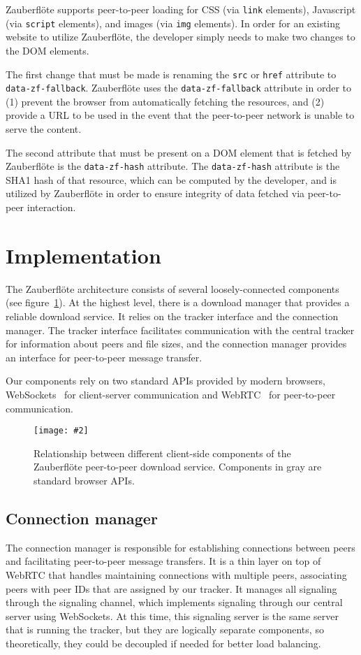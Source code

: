 \documentclass[letterpaper,twocolumn,10pt]{article}
\newcommand{\zbf}{Zauberfl\"{o}te\xspace}
\newcommand{\inclfigure}[3]{
    \begin{figure}
        \begin{centering}
            \texttt{[image: \#2]}
            \caption{#3}
            \label{#1}
        \end{centering}
    \end{figure}
}
\begin{document}
\zbf supports peer-to-peer loading for CSS (via \texttt{link} elements), Javascript (via \texttt{script} elements), and images (via \texttt{img} elements). In order for an existing website to utilize \zbf, the developer simply needs to make two changes to the DOM elements.

The first change that must be made is renaming the \texttt{src} or \texttt{href} attribute to  \texttt{data-zf-fallback}. \zbf uses the \texttt{data-zf-fallback} attribute in order to (1) prevent the browser from automatically fetching the resources, and (2) provide a URL to be used in the event that the peer-to-peer network is unable to serve the content.

The second attribute that must be present on a DOM element that is fetched by \zbf is the \texttt{data-zf-hash} attribute. The \texttt{data-zf-hash} attribute is the SHA1 hash of that resource, which can be computed by the developer, and is utilized by \zbf in order to ensure integrity of data fetched via peer-to-peer interaction.

\section{Implementation}

The \zbf architecture consists of several loosely-connected components (see
figure~\ref{fig:components}). At the highest level, there is a download manager that
provides a reliable download service. It relies on the tracker interface and
the connection manager. The tracker interface facilitates communication with
the central tracker for information about peers and file sizes, and the
connection manager provides an interface for peer-to-peer message transfer.

Our components rely on two standard APIs provided by modern browsers,
WebSockets~\cite{w3c:websocket} for client-server communication and
WebRTC~\cite{w3c:webrtc} for peer-to-peer communication.

\inclfigure{fig:components}{components.pdf}{
    Relationship between different client-side components of the \zbf
    peer-to-peer download service. Components in gray are standard browser
    APIs.
}

\subsection{Connection manager}

The connection manager is responsible for establishing connections between
peers and facilitating peer-to-peer message transfers. It is a thin layer on
top of WebRTC that handles maintaining connections with multiple peers,
associating peers with peer IDs that are assigned by our tracker. It manages
all signaling through the signaling channel, which implements signaling through
our central server using WebSockets. At this time, this signaling server is the
same server that is running the tracker, but they are logically separate
components, so theoretically, they could be decoupled if needed for better load
balancing.
\end{document}
